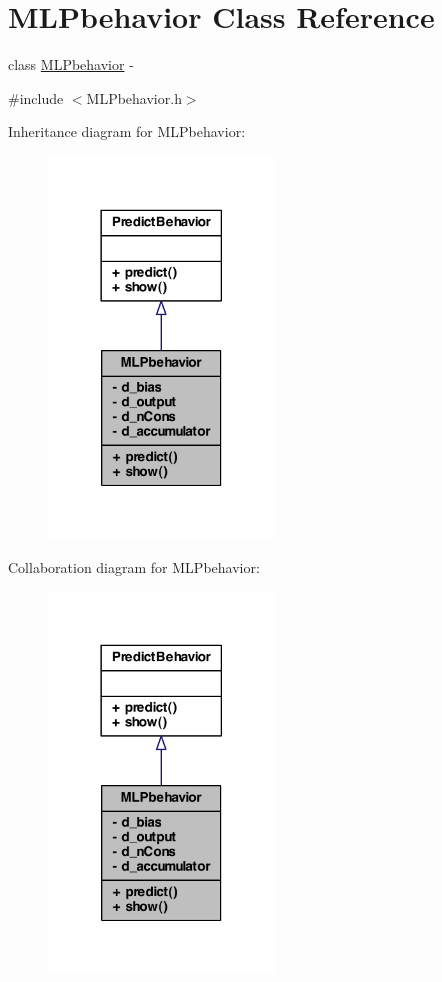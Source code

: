 \hypertarget{class_m_l_pbehavior}{
\section{MLPbehavior Class Reference}
\label{class_m_l_pbehavior}
}


class \hyperlink{class_m_l_pbehavior}{MLPbehavior} -\/  




{\ttfamily \#include $<$MLPbehavior.h$>$}



Inheritance diagram for MLPbehavior:
\nopagebreak
\begin{figure}[H]
\begin{center}
\leavevmode
\includegraphics[width=170pt]{class_m_l_pbehavior__inherit__graph}
\end{center}
\end{figure}


Collaboration diagram for MLPbehavior:
\nopagebreak
\begin{figure}[H]
\begin{center}
\leavevmode
\includegraphics[width=170pt]{class_m_l_pbehavior__coll__graph}
\end{center}
\end{figure}
